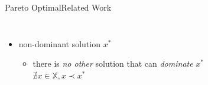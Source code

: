 \begin{frame}{Pareto Optimal}{Related Work}
\begin{columns}
\begin{minipage}{\textwidth}
\begin{itemize}
\begin{itemize}
	$ \exists k, f_{k} (x_{a}) < f_{k} (x_{b}) $
	\\ $ x_{a} $ is \emph{at least better in one} objective than $ x_{b} $
\end{itemize}
\item non-dominant solution $ x^{*} $ \\
\begin{itemize}
	\item there is \emph{no other} solution that can \emph{dominate} $ x^{*} $ \\
	$ \nexists x \in \mathbb{X}, x \prec x^{*} $
\end{itemize}
\end{itemize}
\end{minipage}
\end{columns}
\end{frame}

